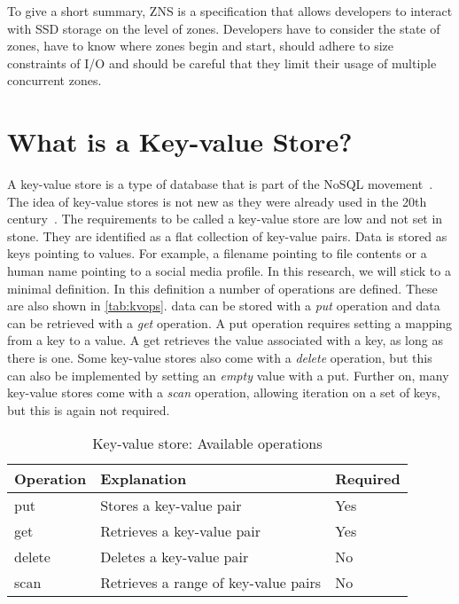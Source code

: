 To give a short summary, ZNS is a specification that allows developers to interact with SSD storage on the level of zones. Developers have to consider the state of zones, have to know where zones begin and start, should adhere to size constraints of I/O and should be careful that they limit their usage of multiple concurrent zones.

\section{What is a Key-value Store?}
A key-value store is a type of database that is part of the NoSQL movement~\cite{doekemeijer2022key}. The idea of key-value stores is not new as they were already used in the 20th century~\cite{sharma2012sql}. The requirements to be called a key-value store are low and not set in stone. They are identified as a flat collection of key-value pairs. Data is stored as keys pointing to values. For example, a filename pointing to file contents or a human name pointing to a social media profile. In this research, we will stick to a minimal definition. In this definition a number of operations are defined. These are also shown in \autoref{tab:kvops}. data can be stored with a \textit{put} operation and data can be retrieved with a \textit{get} operation. A put operation requires setting a mapping from a key to a value. A get retrieves the value associated with a key, as long as there is one. Some key-value stores also come with a \textit{delete} operation, but this can also be implemented by setting an \textit{empty} value with a put. Further on, many key-value stores come with a \textit{scan} operation, allowing iteration on a set of keys, but this is again not required.

\begin{table}[h!]
    \centering
    \begin{tabular}{||l l l||}
        \hline
        Operation & Explanation & Required \\
        \hline \hline
            put & Stores a key-value pair & Yes \\
            \hline
            get & Retrieves a key-value pair & Yes \\
            \hline
            delete & Deletes a key-value pair & No \\
            \hline
            scan & Retrieves a range of key-value pairs & No\\
         \hline
    \end{tabular}
    \caption{Key-value store: Available operations}
    \label{tab:kvops}
\end{table}

